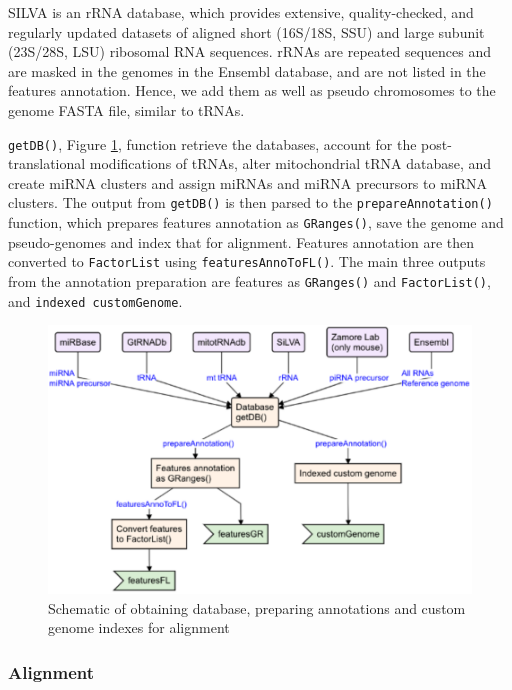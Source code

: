 \documentclass[12pt,twoside]{reedthesis}
\begin{document}
SILVA is an rRNA database, which provides extensive, quality-checked,
and regularly updated datasets of aligned short (16S/18S, SSU) and large
subunit (23S/28S, LSU) ribosomal RNA sequences. rRNAs are repeated
sequences and are masked in the genomes in the Ensembl database, and are
not listed in the features annotation. Hence, we add them as well as
pseudo chromosomes to the genome FASTA file, similar to tRNAs.

\texttt{getDB()}, Figure \ref{fig:3f6}, function retrieve the databases, account for the
post-translational modifications of tRNAs, alter mitochondrial tRNA
database, and create miRNA clusters and assign miRNAs and miRNA
precursors to miRNA clusters. The output from \texttt{getDB()} is then parsed to
the \texttt{prepareAnnotation()} function, which prepares features annotation as
\texttt{GRanges()}, save the genome and pseudo-genomes and index that for
alignment. Features annotation are then converted to \texttt{FactorList} using
\texttt{featuresAnnoToFL()}. The main three outputs from the annotation
preparation are features as \texttt{GRanges()} and \texttt{FactorList()}, and \texttt{indexed\ customGenome}.


\begin{figure}[htbp]

{\centering \includegraphics{thesis_files/figure-latex/3f6-1} 

}

\caption{Schematic of obtaining database, preparing annotations and custom genome indexes for alignment}\label{fig:3f6}
\end{figure}
\hypertarget{alignment}{%
\subsubsection{Alignment}\label{alignment}}
\end{document}
